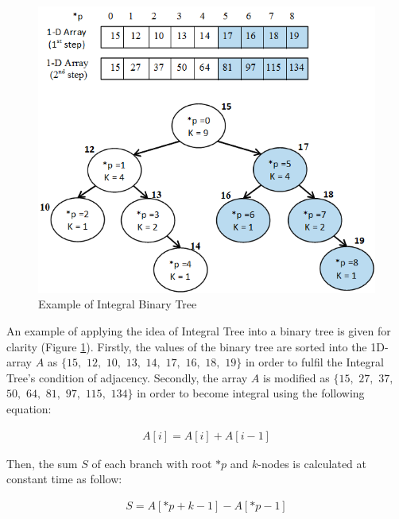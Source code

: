 \documentclass{subfiles}
\begin{document}
\begin{figure}[!htbp]
	\centering
	\includegraphics[width=4.8in]{img/IntegralBinaryTree}
	\caption{Example of Integral Binary Tree}
	\label{fig:IntegralBinaryTree}
\end{figure}

\par  An example of applying the idea of Integral Tree into a binary tree is given for clarity (Figure \ref{fig:IntegralBinaryTree}). Firstly, the values of the binary tree are sorted into the 1D-array $A$ as $\{15,$ $12,$ $10,$ $13,$ $14,$ $17,$ $16,$ $18,$ $19\}$ in order to fulfil the Integral Tree's condition of adjacency. Secondly, the array $A$ is modified as $\{15,$ $27,$ $37,$ $50,$ $64,$ $81,$ $97,$ $115,$ $134\}$ in order to become integral using the following equation:

\begin{equation}
\begin{split}
A[i]=A[i]+A[i-1]
\end{split}
\end{equation}


\par Then, the sum $S$ of each branch with root $*p$ and $k$-nodes is calculated at constant time as follow:


\begin{equation}
\begin{split}
S = A[*p+k-1]-A[*p-1]
\end{split}
\end{equation}
\end{document}
